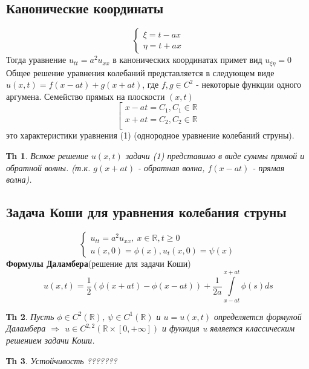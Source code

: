 \documentclass[14pt]{article}
\theoremstyle{plain}
\newtheorem{Thm}{Тh}
\theoremstyle{definition}
\begin{document}
			\subsection{Канонические координаты}
				\begin{equation*}
					\begin{cases}
						\xi = t - ax \\
						\eta = t + ax
					\end{cases}
				\end{equation*}
			Тогда уравнение $u_{tt} = a^2 u_{xx}$ в канонических координатах примет вид $ u_{\xi \eta} = 0$\newline
			Общее решение уравнения колебаний представляется в следующем виде $u(x,t) = f(x - at) + g(x + at)$, где $f,g \in C^2$ - некоторые функции одного аргумена. \newline
			Семейство прямых на плоскости $(x,t)$ 
			\begin{equation*}
				\left[ 
				\begin{gathered} 
					x - at = C_1, C_1 \in \mathbb{R} \\
					x + at = C_2, C_2 \in \mathbb{R} \\
				\end{gathered} 
				\right.
			\end{equation*}
			это характеристики уравнения (1) (однородное уравнение колебаний струны). 
			\begin{Thm}
				Всякое решение $u(x,t)$ задачи (1)	представимо в виде суммы прямой и обратной волны. (т.к. $g(x+at)$ - обратная волна, $f(x-at)$ - прямая волна). 	
			\end{Thm}
			\subsection{Задача Коши для уравнения колебания струны}
				\begin{equation*}
				\left\{ 
					\begin{array}{ll} 
						u_{tt} = a^2 u_{xx}, \ x \in \mathbb{R}, t \geq 0\\
						u(x,0) = \phi(x), u_t(x,0) = \psi(x)  \end{array}\right.
				\end{equation*}
				\textbf{Формулы Даламбера}(решение для задачи Коши)\newline
				$$
				u(x,t) = \dfrac{1}{2} \left(\phi(x + at) - \phi(x -at) \right) + \dfrac{1}{2a} \int\limits_{x - at}^{x + at} \phi(s) ds 
				$$
				\begin{Thm}
					Пусть $\phi \in C^2(\mathbb{R})$, $\psi \in C^1(\mathbb{R})$ и $u = u(x,t)$ определяется формулой Даламбера $\Rightarrow$ $u\in C^{2,2}(\mathbb{R} \times [0, +\infty])$ и фукнция u является классическим решением задачи Коши. 	
				\end{Thm}
				\begin{Thm}
					Устойчивость ???????	
				\end{Thm}
\end{document}
